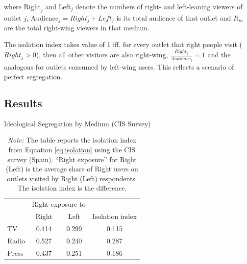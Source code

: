 \documentclass[12pt]{article}
\begin{document}
%
where $\mathrm{Right}_j$ and $\mathrm{Left}_j$ denote the numbers of right- and left-leaning viewers of outlet $j$, $\text{Audience}_j=Right_j + Left_j$ is its total audience of that outlet and $R_m$ are the total right-wing viewers in that medium. 

The isolation index takes value of 1 iff, for every outlet that right people visit ($Right_j>0$), then all other visitors are also right-wing, $\frac{Right_j}{Audience_j}=1$ and the analogous for outlets consumed by left-wing users. This reflects a scenario of perfect segregation. 




	\subsection{Results}
\FloatBarrier	
	
	\begin{table}[H]
		\caption{Ideological Segregation by Medium (CIS Survey)}
		\label{tab:isolation_table}
		
		\centering
		\begin{tabular}{lccc}
			\hline
			& \multicolumn{2}{c}{Right exposure to } & \\
			\cline{2-3}
			& Right & Left & Isolation index \\
			\hline
			TV    & 0.414 & 0.299 & 0.115 \\
			Radio & 0.527 & 0.240 & 0.287 \\
			Press & 0.437 & 0.251 & 0.186 \\
			\hline
		\end{tabular}
		

		
		\caption*{\small  \textit{Note:} The table reports the isolation index from Equation \eqref{eq:isolation}  using the CIS survey (Spain). “Right exposure” for Right (Left) is the average share of Right users on outlets visited by Right (Left) respondents. The isolation index is the difference.}
		
	\end{table}
	
	
	
\end{document}
